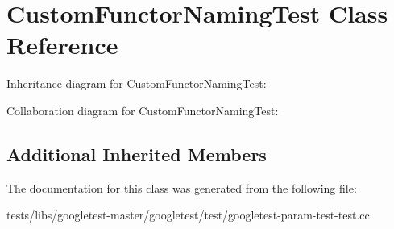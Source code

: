 \hypertarget{classCustomFunctorNamingTest}{}\section{Custom\+Functor\+Naming\+Test Class Reference}
\label{classCustomFunctorNamingTest}


Inheritance diagram for Custom\+Functor\+Naming\+Test\+:


Collaboration diagram for Custom\+Functor\+Naming\+Test\+:
\subsection*{Additional Inherited Members}


The documentation for this class was generated from the following file\+:\begin{DoxyCompactItemize}
\item 
tests/libs/googletest-\/master/googletest/test/googletest-\/param-\/test-\/test.\+cc\end{DoxyCompactItemize}

